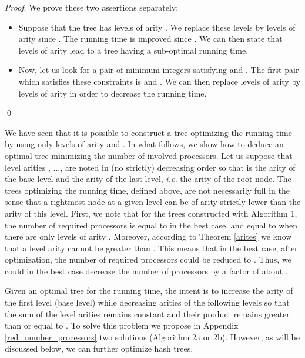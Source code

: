 \documentclass{llncs}
\renewenvironment{proof}{\paragraph{Proof} }{\hfill\qed}
\renewcommand{\paragraph}[1]{\noindent\textit{#1}.}
\begin{document}
\begin{sloppypar}
\begin{proof}
We prove these two assertions separately:
\begin{itemize}
 \item Suppose that the tree has  levels of arity . We 
replace these  levels by  levels of arity  since .
The running time is improved since . 
We can then state that  levels of arity  lead to a tree having a sub-optimal running time. 
 \item Now, let us look for a pair of minimum integers  satisfying  and . 
The first pair which satisfies these constraints is  and . We can then replace
 levels of arity  by  levels of arity  in order to decrease the running time. 
\end{itemize}
\end{proof}
\end{sloppypar}


\begin{sloppypar}
We have seen that it is possible to construct a tree optimizing the running time by using only levels of arity  and .
In what follows, we 
show how 
to deduce an optimal tree minimizing the number of involved processors.
Let us suppose that level arities ,  ...,  are noted in (no strictly) decreasing order so that  
is the arity of the base level and  the arity of the last level, 
\textit{i.e.} the arity of the root node. 
The trees optimizing the running time, defined above, are not necessarily full in the sense that a rightmost node at a given level can be of arity 
strictly lower than the arity of this level. First, we note that for the trees constructed with Algorithm 1, the number of required processors
is equal to  in the best case, and equal to  when there are only levels of arity . Moreover, 
according to Theorem \ref{arites} 
we know that a level arity cannot be greater than . This means that in the best case, after optimization, the number of required processors 
could be reduced to . Thus, we could in the best case decrease the number of processors 
by a factor of about .
\end{sloppypar}


Given an optimal tree for the running time, the intent is to increase the arity of the first level (base level) while decreasing arities 
of the following levels so that the sum of the level arities remains constant and their product remains greater than or equal to .
To solve this problem we propose in Appendix \ref{red_number_processors} two solutions (Algorithm 2a or 2b). However, as will be discussed below,
we can further optimize hash trees.
\end{document}
